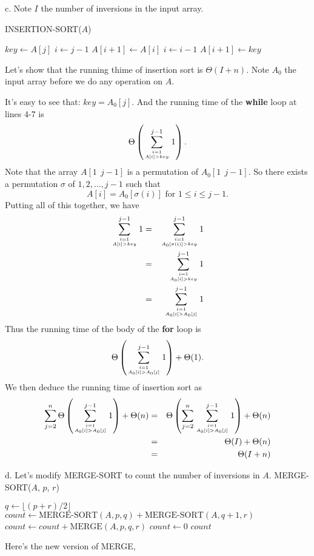 \documentclass[a4paper,12pt]{article}
\newcommand{\subpar}[1]
{\medskip \noindent #1.}
\newcommand{\la}{\leftarrow}
\begin{document}
\subpar{c} Note $I$ the number of inversions in the input array.

\noindent
INSERTION-SORT($A$)
\begin{algorithmic}[1]
\FOR {$j \la 2$ \textbf{to} $length[A]$}
	\STATE $key \la A[j]$
	\STATE $i \la j-1$
		\STATE $A[i+1] \la A[i]$
		\STATE $i \la i-1$
	\ENDWHILE
	\STATE $A[i+1] \la key$
\ENDFOR
\end{algorithmic}
Let's show that the running thime of insertion sort is
$\Theta(I+n)$.  Note $A_0$ the input array before we do any
operation on $A$.

It's easy to see that: $key = A_0[j]$.  And the running time of the
\textbf{while} loop at lines $4$-$7$ is
\[ \Theta\left(\sum_{i=1\atop A[i] > key}^{j-1} 1\right).\]
Note that the array $A[1\ \ j-1]$ is a permutation of
$A_0[1\ \ j-1]$.  So there exists a permutation $\sigma$ of $1, 2,
  \dots, j-1$ such that
\[ A[i] = A_0[\sigma(i)] \mbox{ for } 1 \le i \le j-1.\]
Putting all of this together, we have
\begin{eqnarray*}
\sum_{i=1\atop A[i] > key}^{j-1} 1 &=& 
\sum_{i=1\atop A_0[\sigma(i)] > key}^{j-1} 1\\ &=&
\sum_{i=1\atop A_0[i] > key}^{j-1} 1\\ &=&
\sum_{i=1\atop A_0[i] > A_0[j]}^{j-1} 1
\end{eqnarray*}
Thus the running time of the body of the \textbf{for} loop is
\[\Theta\left(\sum_{i=1\atop A_0[i] > A_0[j]}^{j-1}1\right)
+ \Theta(1).\]
We then deduce the running time of insertion sort as
\begin{eqnarray*}
\sum_{j=2}^n \Theta\left(\sum_{i=1\atop A_0[i] > A_0[j]}^{j-1}1\right)
+ \Theta(n) &=& \Theta\left(
\sum_{j=2}^n\sum_{i=1\atop A_0[i] > A_0[j]}^{j-1}1\right) +
\Theta(n)\\&=&
\Theta(I) + \Theta(n) \\&=&
\Theta(I+n)
\end{eqnarray*}

\subpar{d}  Let's modify MERGE-SORT to count the number of inversions in $A$.
\noindent
MERGE-SORT($A$, $p$, $r$)
\begin{algorithmic}[1]
	\STATE $q \la \lfloor(p+r)/2\rfloor$
	\STATE $count \la \mbox{MERGE-SORT}(A, p, q) +
		\mbox{MERGE-SORT}(A, q+1, r)$
	\STATE $count \la count + \mbox{MERGE}(A, p, q,r)$
\ELSE
	\STATE $count \la 0$
\ENDIF
\RETURN $count$
\end{algorithmic}

Here's the new version of MERGE,
\end{document}
